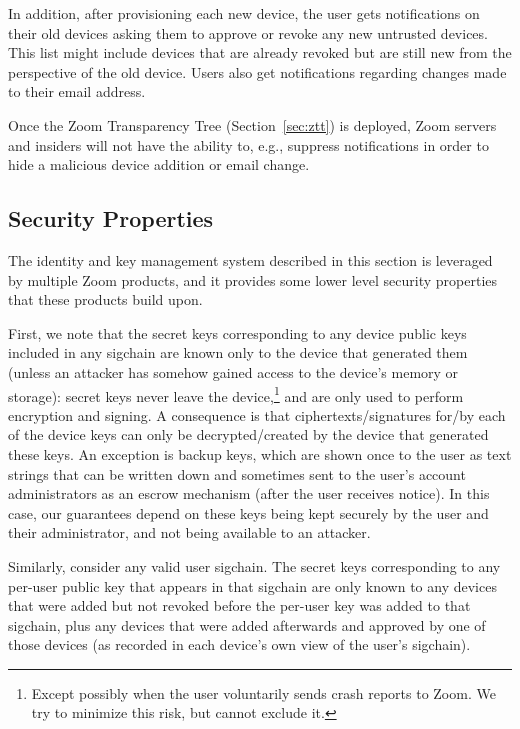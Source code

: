 In addition, after provisioning each new device, the user gets notifications on their old devices
asking them to approve or revoke any new untrusted devices. This list might include devices that are
already revoked but are still new from the perspective of the old device. Users also get
notifications regarding changes made to their email address.

Once the Zoom Transparency Tree (Section~\ref{sec:ztt}) is deployed, Zoom servers and insiders will
not have the ability to, e.g., suppress notifications in order to hide a malicious device addition
or email change.




\subsection{Security Properties}
\label{sec:IdKmProps}

The identity and key management system described in this section is leveraged by multiple Zoom
products, and it provides some lower level security properties that these products build upon.

First, we note that the secret keys corresponding to any device public keys included in any sigchain
are known only to the device that generated them (unless an attacker has somehow gained access to
the device's memory or storage): secret keys never leave the device,\footnote{Except possibly when
the user voluntarily sends crash reports to Zoom. We try to minimize this risk, but cannot exclude
it.} and are only used to perform encryption and signing. A consequence is that
ciphertexts/signatures for/by each of the device keys can only be decrypted/created by the device
that generated these keys. An exception is backup keys, which are shown once to the user as text
strings that can be written down and sometimes sent to the user's account administrators as an
escrow mechanism (after the user receives notice). In this case, our guarantees depend on these
keys being kept securely by the user and their administrator, and not being available to an
attacker.

Similarly, consider any valid user sigchain. The secret keys corresponding to any per-user public
key that appears in that sigchain are only known to any devices that were added but not revoked
before the per-user key was added to that sigchain, plus any devices that were added afterwards and
approved by one of those devices (as recorded in each device's own view of the user's sigchain).

